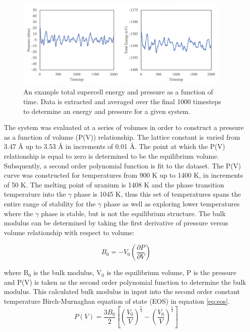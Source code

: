 \documentclass[review]{elsarticle}
\begin{document}
\begin{figure}[h]
 \centering
 \includegraphics[width=0.95\textwidth]{1_convergence.png} 
 \caption{An example total supercell energy and pressure as a function of time. Data is extracted and averaged over the final 1000 timesteps to determine an energy and pressure for a given system. }
 \label{fig:convergence}
\end{figure}

\FloatBarrier

The system was evaluated at a series of volumes in order to construct a pressure as a function of volume (P(V)) relationship. The lattice constant is varied from 3.47 {\AA} up to 3.53 {\AA} in increments of 0.01 {\AA}. The point at which the P(V) relationship is equal to zero is determined to be the equilibrium volume. Subsquently, a second order polynomial function is fit to the dataset. The P(V) curve was constructed for temperatures from 900 K up to 1400 K, in increments of 50 K. The melting point of uranium is 1408 K and the phase transition temperature into the $\gamma$ phase is 1045 K, thus this set of temperatures spans the entire range of stability for the $\gamma$ phase as well as exploring lower temperatures where the $\gamma$ phase is stable, but is not the equilibrium structure. The bulk modulus can be determined by taking the first derivative of pressure versus volume relationship with respect to volume:

\begin{equation}
\label{eq:bulk}
B_{0} = -V_0 \left( \frac{\partial P}{\partial V} \right)
\end{equation}

where B$_0$ is the bulk modulus, V$_0$ is the equilibrium volume, P is the pressure and P(V) is taken as the second order polynomial function to determine the bulk modulus. This calculated bulk modulus in input into the second order constant temperature Birch-Murnaghan equation of state (EOS) in equation \ref{eq:eos}.
\begin{equation}
\label{eq:eos}
P(V) = \frac{3B_0}{2} \left[ \left(\frac{V_0}{V}\right)^{\frac{7}{3}} - \left(\frac{V_0}{V}\right)^{\frac{5}{3}} \right]
\end{equation}
\end{document}
